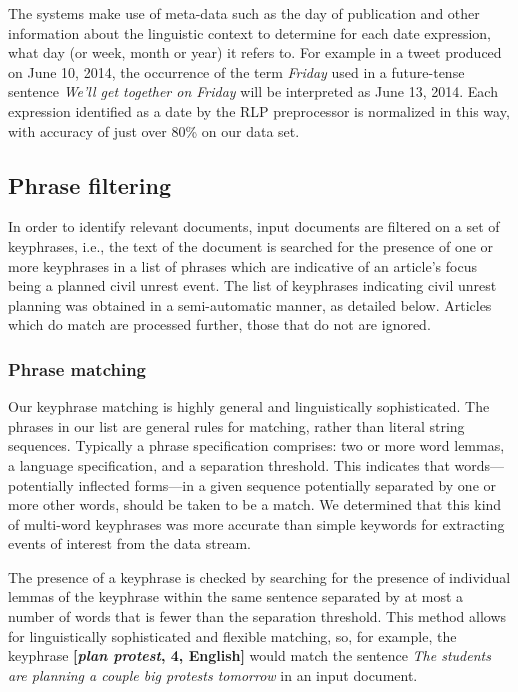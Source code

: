 The systems make use of meta-data such as the day of publication and
other information about the linguistic context to determine for each
date expression, what day (or week, month or year) it refers to. For
example in a tweet produced on June 10, 2014, the occurrence of the
term {\em Friday} used in a future-tense sentence {\em We'll get
  together on Friday} will be interpreted as June 13, 2014.  Each
expression identified as a date by the RLP preprocessor is normalized
in this way, with accuracy of just over 80\% on our data set.

\subsection{Phrase filtering}
In order to identify relevant documents, input documents are filtered on
a set of keyphrases, i.e., the text of the document is searched for the
presence of one or more keyphrases in a list of phrases which are
indicative of an article's focus being a planned civil unrest event.
The list of keyphrases indicating civil unrest planning was obtained in
a semi-automatic manner, as detailed below.  Articles which do match are
processed further, those that do not are ignored.

\subsubsection{Phrase matching}
Our keyphrase matching is highly general and linguistically
sophisticated.  The phrases in our list are general rules for matching,
rather than literal string sequences. Typically a phrase specification
comprises: two or more word lemmas, a language specification, and a
separation threshold. This indicates that words---potentially inflected
forms---in a given sequence potentially separated by one or more other
words, should be taken to be a match. We determined that this kind of
multi-word keyphrases was more accurate than simple keywords for
extracting events of interest from the data stream.

The presence of a keyphrase is checked by searching for the presence of
individual lemmas of the keyphrase within the same sentence separated
by at most a number of words that is fewer than the separation
threshold.  This method allows for linguistically sophisticated and
flexible matching, so, for example, the keyphrase {\bf [{\em plan
protest}, 4, English]} would match the sentence {\em The students are
planning a couple big protests tomorrow} in an input document.


